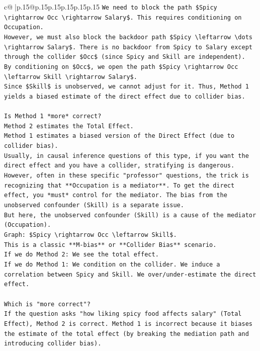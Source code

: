 \documentclass{article}
\begin{document}
{\begin{supertabular}{c@{$\;$}|p{.15\linewidth}@{}p{.15\linewidth}p{.15\linewidth}p{.15\linewidth}p{.15\linewidth}p{.15\linewidth}}
{{{\texttt{We need to block the path \$Spicy \textbackslash{}rightarrow Occ \textbackslash{}rightarrow Salary\$. This requires conditioning on Occupation.} \\
\texttt{However, we must also block the backdoor path \$Spicy \textbackslash{}leftarrow \textbackslash{}dots \textbackslash{}rightarrow Salary\$. There is no backdoor from Spicy to Salary except through the collider \$Occ\$ (since Spicy and Skill are independent).} \\
\texttt{By conditioning on \$Occ\$, we open the path \$Spicy \textbackslash{}rightarrow Occ \textbackslash{}leftarrow Skill \textbackslash{}rightarrow Salary\$.} \\
\texttt{Since \$Skill\$ is unobserved, we cannot adjust for it. Thus, Method 1 yields a biased estimate of the direct effect due to collider bias.} \\
\\ 
\texttt{Is Method 1 *more* correct?} \\
\texttt{Method 2 estimates the Total Effect.} \\
\texttt{Method 1 estimates a biased version of the Direct Effect (due to collider bias).} \\
\texttt{Usually, in causal inference questions of this type, if you want the direct effect and you have a collider, stratifying is dangerous.} \\
\texttt{However, often in these specific "professor" questions, the trick is recognizing that **Occupation is a mediator**. To get the direct effect, you *must* control for the mediator. The bias from the unobserved confounder (Skill) is a separate issue.} \\
\texttt{But here, the unobserved confounder (Skill) is a cause of the mediator (Occupation).} \\
\texttt{Graph: \$Spicy \textbackslash{}rightarrow Occ \textbackslash{}leftarrow Skill\$.} \\
\texttt{This is a classic **M{-}bias** or **Collider Bias** scenario.} \\
\texttt{If we do Method 2: We see the total effect.} \\
\texttt{If we do Method 1: We condition on the collider. We induce a correlation between Spicy and Skill. We over/under{-}estimate the direct effect.} \\
\\ 
\texttt{Which is "more correct"?} \\
\texttt{If the question asks "how liking spicy food affects salary" (Total Effect), Method 2 is correct. Method 1 is incorrect because it biases the estimate of the total effect (by breaking the mediation path and introducing collider bias).} \\
}}}
\end{supertabular}}
\end{document}
